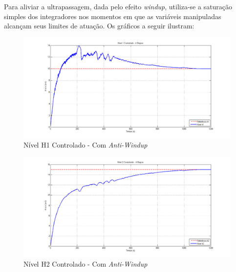 Para aliviar a ultrapassagem, dada pelo efeito \textit{windup}, utiliza-se a saturação simples dos integradores nos momentos em que as variáveis manipuladas alcançam seus limites de atuação. Os gráficos a seguir ilustram:
\begin{figure}[H]
	\centering
	\includegraphics[width=\textwidth]{img/nm_ctrl_h1ts2.png}
	\caption{\small Nível H1 Controlado - Com \textit{Anti-Windup}}
	\label{figH1TSCtrl2_nm}
\end{figure}

\begin{figure}[H]
	\centering
	\includegraphics[width=\textwidth]{img/nm_ctrl_h2ts2.png}
	\caption{Nível H2 Controlado - Com \textit{Anti-Windup}}
	\label{figH2CtrlTS2_nm}
\end{figure}

